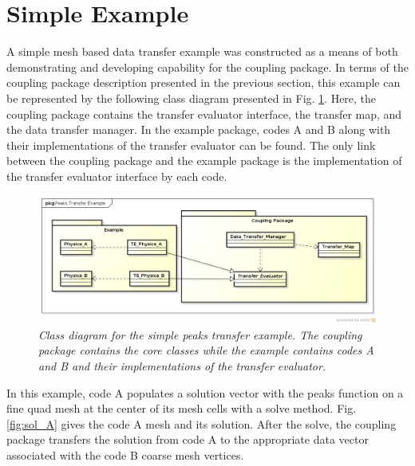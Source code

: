 \documentclass[letterpaper]{article}
\begin{document}
\section{Simple Example}
A simple mesh based data transfer example was constructed as a
means of both demonstrating and developing capability for the coupling
package. In terms of the coupling package description presented in the
previous section, this example can be represented by the following
class diagram presented in Fig. \ref{fig:example_domain}. Here, the
coupling package contains the transfer evaluator interface, the
transfer map, and the data transfer manager. In the example package,
codes A and B along with their implementations of the transfer
evaluator can be found. The only link between the coupling package and
the example package is the implementation of the transfer evaluator
interface by each code. 

\begin{figure}[htpb!]
  \begin{center}
    \includegraphics[width=6in]{images/Example_Diagram.png}
  \end{center}
  \caption{\small \sl Class diagram for the simple peaks transfer
    example. The coupling package contains the core classes while the
    example contains codes A and B and their implementations of the
    transfer evaluator.}
  \label{fig:example_domain}
\end{figure}

In this example, code A populates a solution vector with the
peaks function on a fine quad mesh at the center of its mesh cells
with a solve method. Fig. \ref{fig:sol_A} gives the code A mesh and its 
solution. After the solve, the coupling package transfers the solution
from code A to the appropriate data vector associated with the code B
coarse mesh vertices.
\end{document}
